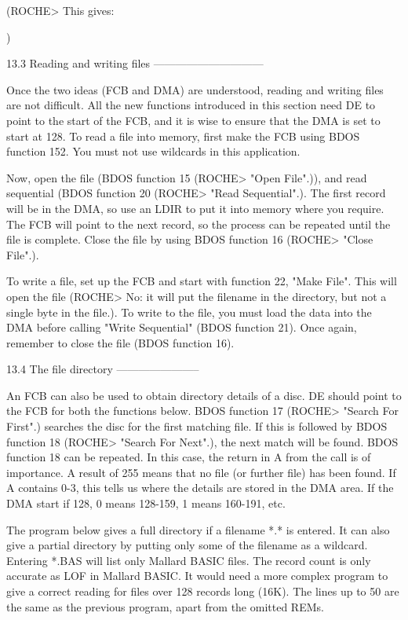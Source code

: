 (ROCHE> This gives:

$$$$
)


13.3 Reading and writing files
------------------------------

Once the two ideas (FCB and DMA) are understood, reading and writing files are 
not  difficult.  All the new functions introduced in this section need  DE  to 
point to the start of the FCB, and it is wise to ensure that the DMA is set to 
start  at  128.  To read a file into memory, first make  the  FCB  using  BDOS 
function 152. You must not use wildcards in this application.

Now,  open  the  file  (BDOS function 15  (ROCHE>  "Open  File".)),  and  read 
sequential  (BDOS  function 20 (ROCHE> "Read Sequential".). The  first  record 
will  be in the DMA, so use an LDIR to put it into memory where  you  require. 
The  FCB will point to the next record, so the process can be  repeated  until 
the file is complete. Close the file by using BDOS function 16 (ROCHE>  "Close 
File".).

To write a file, set up the FCB and start with function 22, "Make File".  This 
will open the file (ROCHE> No: it will put the filename in the directory,  but 
not a single byte in the file.). To write to the file, you must load the  data 
into the DMA before calling "Write Sequential" (BDOS function 21). Once again, 
remember to close the file (BDOS function 16).


13.4 The file directory
-----------------------

An FCB can also be used to obtain directory details of a disc. DE should point 
to the FCB for both the functions below. BDOS function 17 (ROCHE> "Search  For 
First".) searches the disc for the first matching file. If this is followed by 
BDOS  function 18 (ROCHE> "Search For Next".), the next match will  be  found. 
BDOS function 18 can be repeated. In this case, the return in A from the  call 
is  of  importance. A result of 255 means that no file (or further  file)  has 
been  found. If A contains 0-3, this tells us where the details are stored  in 
the DMA area. If the DMA start if 128, 0 means 128-159, 1 means 160-191, etc.

The program below gives a full directory if a filename *.* is entered. It  can 
also  give  a  partial directory by putting only some of  the  filename  as  a 
wildcard. Entering *.BAS will list only Mallard BASIC files. The record  count 
is only accurate as LOF in Mallard BASIC. It would need a more complex program 
to give a correct reading for files over 128 records long (16K). The lines  up 
to 50 are the same as the previous program, apart from the omitted REMs.

